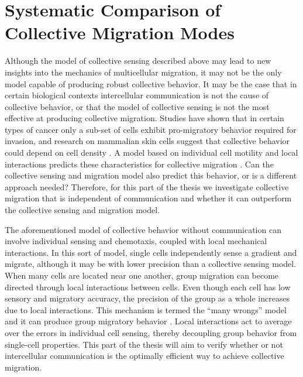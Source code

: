 \documentclass[phys,prelim]{puthesis}
\begin{document}
\section{Systematic Comparison of Collective Migration Modes}

Although the model of collective sensing described above may lead to new insights into the mechanics of multicellular migration, it may not be the only model capable of producing robust collective behavior. It may be the case that in certain biological contexts intercellular communication is not the cause of collective behavior, or that the model of collective sensing is not the most effective at producing collective migration. Studies have shown that in certain types of cancer only a sub-set of cells exhibit pro-migratory behavior required for invasion, and research on mammalian skin cells suggest that collective behavior could depend on cell density \cite{deisboeck2009collective}. A model based on individual cell motility and local interactions predicts these characteristics for collective migration \cite{coburn2013tactile}. Can the collective sensing and migration model also predict this behavior, or is a different approach needed? Therefore, for this part of the thesis we investigate collective migration that is independent of communication and whether it can outperform the collective sensing and migration model.


The aforementioned model of collective behavior without communication can involve individual sensing and chemotaxis, coupled with local mechanical interactions. In this sort of model, single cells independently sense a gradient and migrate, although it may be with lower precision than a collective sensing model. When many cells are located near one another, group migration can become directed through local interactions between cells. Even though each cell has low sensory and migratory accuracy, the precision of the group as a whole increases due to local interactions. This mechanism is termed the ``many wrongs'' model and it can produce group migratory behavior \cite{simons2004many,coburn2013tactile}. Local interactions act to average over the errors in individual cell sensing, thereby decoupling group behavior from single-cell properties. This part of the thesis will aim to verify whether or not intercellular communication is the optimally efficient way to achieve collective migration.
\end{document}
